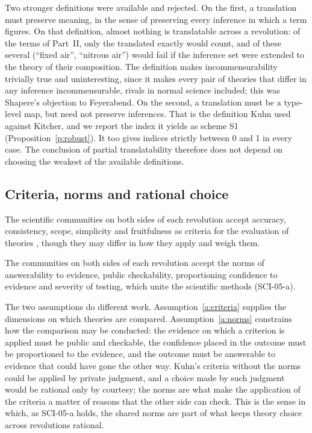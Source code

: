 \documentclass{situationist-preprint}
\begin{document}
Two stronger definitions were available and rejected. On the first, a translation must preserve meaning, in the sense of preserving every inference in which a term figures. On that definition, almost nothing is translatable across a revolution: of the \ntermsall{} terms of Part~II, only the \nstatE{} translated exactly would count, and of these several (\enquote{fixed air}, \enquote{nitrous air}) would fail if the inference set were extended to the theory of their composition. The definition makes incommensurability trivially true and uninteresting, since it makes every pair of theories that differ in any inference incommensurable, rivals in normal science included; this was Shapere's objection to Feyerabend. On the second, a translation must be a type-level map, but need not preserve inferences. That is the definition Kuhn used against Kitcher, and we report the index it yields as scheme S1 (Proposition~\ref{p:robust}). It too gives indices strictly between 0 and 1 in every case. The conclusion of partial translatability therefore does not depend on choosing the weakest of the available definitions.

\subsection{Criteria, norms and rational choice}

\begin{assumption}\label{a:criteria}
The scientific communities on both sides of each revolution accept accuracy, consistency, scope, simplicity and fruitfulness as criteria for the evaluation of theories \citep{Kuhn1977}, though they may differ in how they apply and weigh them.
\end{assumption}

\begin{assumption}\label{a:norms}
The communities on both sides of each revolution accept the norms of answerability to evidence, public checkability, proportioning confidence to evidence and severity of testing, which unite the scientific methods (SCI-05-a).
\end{assumption}

The two assumptions do different work. Assumption~\ref{a:criteria} supplies the dimensions on which theories are compared. Assumption~\ref{a:norms} constrains how the comparison may be conducted: the evidence on which a criterion is applied must be public and checkable, the confidence placed in the outcome must be proportioned to the evidence, and the outcome must be answerable to evidence that could have gone the other way. Kuhn's criteria without the norms could be applied by private judgment, and a choice made by such judgment would be rational only by courtesy; the norms are what make the application of the criteria a matter of reasons that the other side can check. This is the sense in which, as SCI-05-a holds, the shared norms are part of what keeps theory choice across revolutions rational.
\end{document}
